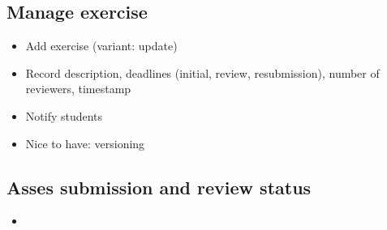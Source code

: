 \documentclass[Main]{subfiles}
\begin{document}
\subsection{Manage exercise}

\begin{itemize}
\item Add exercise (variant: update)
\item Record description, deadlines (initial, review, resubmission), number of reviewers, timestamp
\item Notify students
\item Nice to have: versioning
\end{itemize}

\subsection{Asses submission and review status}

\begin{itemize}
\item 
\end{itemize}
\end{document}
